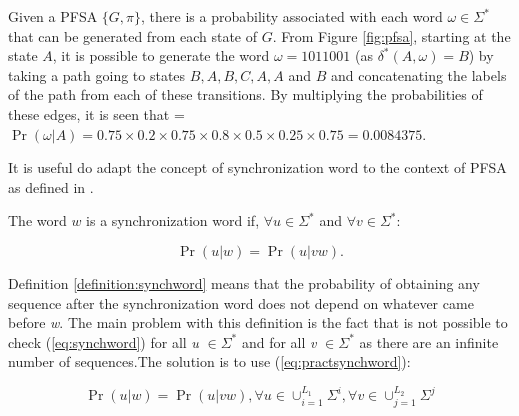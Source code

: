 {Given a PFSA $\{G, \pi\}$, there is a probability associated with each word $\omega \in \Sigma^*$ that can be generated from each state of $G$. From Figure \ref{fig:pfsa}, starting at the state $A$, it is possible to generate the word $\omega = 1011001$ (as $\delta^*(A, \omega) = B$) by taking a path going to states $B,A,B,C,A,A$ and $B$ and concatenating the labels of the path from each of these transitions. By multiplying the probabilities of these edges, it is seen that  = $\Pr (\omega |A) = 0.75\times0.2\times0.75\times0.8\times0.5\times0.25\times0.75 = 0.0084375$.

It is useful do adapt the concept of synchronization word to the context of PFSA as defined in \citep{asok.11}.

\begin{definition}\label{definition:synchword}
The word $w$ is a synchronization word if, $\forall \textit{u} \in \Sigma^*$ and $\forall \textit{v} \in \Sigma^*$:

\begin{equation}
\Pr(\textit{u}|\textit{w}) = \Pr(\textit{u}|\textit{vw}).
\label{eq:synchword}
\end{equation}
\end{definition}

\noindent Definition \ref{definition:synchword} means that the probability of obtaining any sequence after the synchronization word does not depend on whatever came before \textit{w}. The main problem with this definition is the fact that is not possible to check (\ref{eq:synchword}) for all \textit{u} $\in \Sigma^*$ and for all \textit{v} $\in \Sigma^*$ as there are an infinite number of sequences.The solution is to use (\ref{eq:practsynchword}):

\begin{equation}
\Pr(\textit{u|w}) = \Pr(\textit{u|vw}), \forall u \in \cup_{i=1}^{L_1}\Sigma^i, \forall v \in \cup_{j=1}^{L_2}\Sigma^j  
\label{eq:practsynchword}
\end{equation}



}
